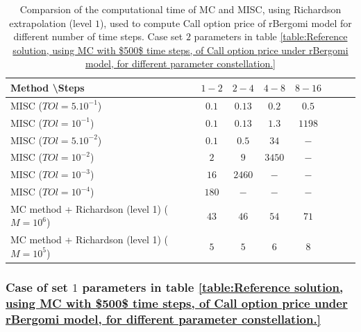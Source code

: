 \documentclass[11pt]{article}
\begin{document}
\begin{table}[h!]
	\centering
	\begin{tabular}{l*{6}{c}r}
		Method \textbackslash  Steps            & $1-2$ & $2-4$ & $4-8$ & $8-16$ &   \\
		\hline
			MISC ($TOl=5.10^{-1}$)  & $0.1$ & $0.13$ & $0.2$ & $0.5$  \\
		MISC ($TOl=10^{-1}$)  & $0.1$ & $0.13$ & $1.3$ & $1198$  \\
			MISC ($TOl=5.10^{-2}$)  & $0.1$ & $0.5$ & $34$ & $-$  \\
		MISC ($TOl=10^{-2}$)  & $2$ & $9$ & $3450$ & $-$  \\
			MISC ($TOl=10^{-3}$)  & $16$ & $2460$ & $-$ & $-$  \\
				MISC ($TOl=10^{-4}$)  & $180$ & $-$ & $-$ & $-$  \\
		\hline	
		MC method + Richardson (level 1) ($M=10^{6}$)  &$43$ & $46$  & $54$  & $71$ \\	
			
			MC method + Richardson (level 1) ($M=10^{5}$)  &$5$ & $5$  & $6$  & $8$ \\
		\hline
	\end{tabular}
	\caption{Comparsion of the computational time of  MC and MISC, using Richardson extrapolation (level $1$), used to compute Call option price of rBergomi model for different number of time steps. Case set $2$ parameters in table \ref{table:Reference solution, using MC with $500$ time steps, of Call option price under rBergomi model, for different parameter constellation.}}
	\label{Comparsion of the computational time of  MC and MISC, using Richardson extrapolation (level $1$), used to compute Call option price of rBergomi model for different number of time steps. Case set $2$ parameters}
\end{table}



\FloatBarrier





\subsubsection{Case of set $1$ parameters in table \ref{table:Reference solution, using MC with $500$ time steps, of Call option price under rBergomi model, for different parameter constellation.}}\label{sec:Case of set 1 parameters}
\end{document}
